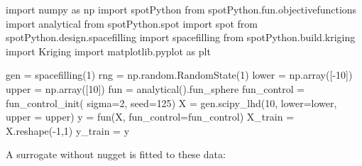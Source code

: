 \documentclass[
  letterpaper,
  DIV=11,
  numbers=noendperiod]{scrreprt}
\newenvironment{Shaded}{\begin{snugshade}}{\end{snugshade}}
\newcommand{\DecValTok}[1]{\textcolor[rgb]{0.68,0.00,0.00}{#1}}
\newcommand{\ImportTok}[1]{\textcolor[rgb]{0.00,0.46,0.62}{#1}}
\newcommand{\NormalTok}[1]{\textcolor[rgb]{0.00,0.23,0.31}{#1}}
\newcommand{\OperatorTok}[1]{\textcolor[rgb]{0.37,0.37,0.37}{#1}}
\begin{document}
\begin{Shaded}
\begin{Highlighting}[]
\ImportTok{import}\NormalTok{ numpy }\ImportTok{as}\NormalTok{ np}
\ImportTok{import}\NormalTok{ spotPython}
\ImportTok{from}\NormalTok{ spotPython.fun.objectivefunctions }\ImportTok{import}\NormalTok{ analytical}
\ImportTok{from}\NormalTok{ spotPython.spot }\ImportTok{import}\NormalTok{ spot}
\ImportTok{from}\NormalTok{ spotPython.design.spacefilling }\ImportTok{import}\NormalTok{ spacefilling}
\ImportTok{from}\NormalTok{ spotPython.build.kriging }\ImportTok{import}\NormalTok{ Kriging}
\ImportTok{import}\NormalTok{ matplotlib.pyplot }\ImportTok{as}\NormalTok{ plt}

\NormalTok{gen }\OperatorTok{=}\NormalTok{ spacefilling(}\DecValTok{1}\NormalTok{)}
\NormalTok{rng }\OperatorTok{=}\NormalTok{ np.random.RandomState(}\DecValTok{1}\NormalTok{)}
\NormalTok{lower }\OperatorTok{=}\NormalTok{ np.array([}\OperatorTok{{-}}\DecValTok{10}\NormalTok{])}
\NormalTok{upper }\OperatorTok{=}\NormalTok{ np.array([}\DecValTok{10}\NormalTok{])}
\NormalTok{fun }\OperatorTok{=}\NormalTok{ analytical().fun\_sphere}
\NormalTok{fun\_control }\OperatorTok{=}\NormalTok{ fun\_control\_init(    }
\NormalTok{    sigma}\OperatorTok{=}\DecValTok{2}\NormalTok{,}
\NormalTok{    seed}\OperatorTok{=}\DecValTok{125}\NormalTok{)}
\NormalTok{X }\OperatorTok{=}\NormalTok{ gen.scipy\_lhd(}\DecValTok{10}\NormalTok{, lower}\OperatorTok{=}\NormalTok{lower, upper }\OperatorTok{=}\NormalTok{ upper)}
\NormalTok{y }\OperatorTok{=}\NormalTok{ fun(X, fun\_control}\OperatorTok{=}\NormalTok{fun\_control)}
\NormalTok{X\_train }\OperatorTok{=}\NormalTok{ X.reshape(}\OperatorTok{{-}}\DecValTok{1}\NormalTok{,}\DecValTok{1}\NormalTok{)}
\NormalTok{y\_train }\OperatorTok{=}\NormalTok{ y}
\end{Highlighting}
\end{Shaded}

A surrogate without nugget is fitted to these data:
\end{document}
